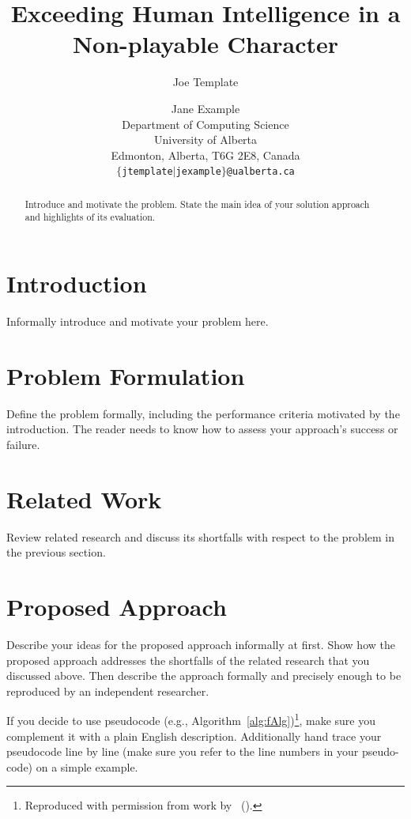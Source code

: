 \documentclass[letterpaper]{article}
\title{Exceeding Human Intelligence in a Non-playable Character}
\author{Joe Template \and Jane Example \\
Department of Computing Science \\ University of Alberta \\
Edmonton, Alberta, T6G 2E8, Canada \\
{\tt $\{$jtemplate$\mid$jexample$\}$@ualberta.ca}}
\newcommand{\citea}[1]{\citeauthor{#1} (\citeyear{#1})}
\numberwithin{equation}{section}
\numberwithin{theorem}{section}
\numberwithin{lemma}{section}
\numberwithin{df}{section}
\begin{document}
\maketitle

\begin{abstract}
Introduce and motivate the problem. State the main idea of your solution approach and highlights of its evaluation.
\end{abstract}

\section{Introduction}

Informally introduce and motivate your problem here.

\section{Problem Formulation}

Define the problem formally, including the performance criteria motivated by the introduction. The reader needs to know how to assess your approach's success or failure.

\section{Related Work}

Review related research and discuss its shortfalls with respect to the problem in the previous section.

\section{Proposed Approach}

Describe your ideas for the proposed approach informally at first. Show how the proposed approach addresses the shortfalls of the related research that you discussed above. Then describe the approach formally and precisely enough to be reproduced by an independent researcher.

If you decide to use pseudocode (e.g., Algorithm~\ref{alg:fAlg})\footnote{Reproduced with permission from work by~\citea{flow}.}, make sure you complement it with a plain English description. Additionally hand trace your pseudocode line by line (make sure you refer to the line numbers in your pseudo-code) on a simple example.
\end{document}
